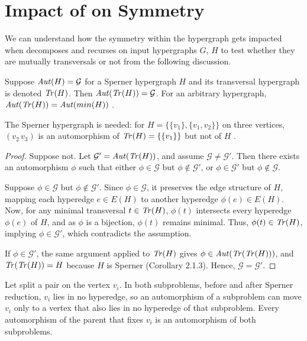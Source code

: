 \section{Impact of \FKA{} on Symmetry}

We can understand how the symmetry within the hypergraph gets impacted when \FKA{} decomposes and recurses on input hypergraphs $G$, $H$ to test whether they are mutually transversals or not from the following discussion.

\begin{lemma}\label{lem:aut-tr}
Suppose $\mathit{Aut}(H)=\mathcal{G}$ for a Sperner hypergraph $H$ and its transversal hypergraph is denoted $\mathit{Tr}(H)$. Then $\mathit{Aut}(\mathit{Tr}(H))=\mathcal{G}$. For an arbitrary hypergraph, $\mathit{Aut}(\mathit{Tr}(H))=\mathit{Aut}(min(H))$ .
\end{lemma}

The Sperner hypergraph is needed: for $H=\{\{v_1\},\{v_1,v_2\}\}$ on three vertices, $(v_2\,v_3)$ is an automorphism of $\mathit{Tr}(H)=\{\{v_1\}\}$ but not of $H$ .

\begin{proof}
Suppose not. Let $\mathcal{G}'=\mathit{Aut}(\mathit{Tr}(H))$, and assume $\mathcal{G}\neq\mathcal{G}'$. Then there exists an automorphism $\phi$ such that either $\phi\in\mathcal{G}$ but $\phi\notin\mathcal{G}'$, or $\phi\in\mathcal{G}'$ but $\phi\notin\mathcal{G}$.

Suppose $\phi\in\mathcal{G}$ but $\phi\notin\mathcal{G}'$. Since $\phi\in\mathcal{G}$, it preserves the edge structure of $H$, mapping each hyperedge $e\in E(H)$ to another hyperedge $\phi(e)\in E(H)$. Now, for any minimal transversal $t\in\mathit{Tr}(H)$, $\phi(t)$ intersects every hyperedge $\phi(e)$ of $H$, and as $\phi$ is a bijection, $\phi(t)$ remains minimal. Thus, $\phi(t)\in\mathit{Tr}(H)$, implying $\phi\in\mathcal{G}'$, which contradicts the assumption.

If $\phi\in\mathcal{G}'$, the same argument applied to $\mathit{Tr}(H)$ gives $\phi\in\mathit{Aut}(\mathit{Tr}(\mathit{Tr}(H)))$, and $\mathit{Tr}(\mathit{Tr}(H))=H$ because $H$ is Sperner (Corollary 2.1.3). Hence, $\mathcal{G}=\mathcal{G}'$.
\end{proof}

\begin{lemma}\label{lem:break}
Let \FKA{} split a pair on the vertex $v_i$. In both subproblems, before and after Sperner reduction, $v_i$ lies in no hyperedge, so an automorphism of a subproblem can move $v_i$ only to a vertex that also lies in no hyperedge of that subproblem. Every automorphism of the parent that fixes $v_i$ is an automorphism of both subproblems.
\end{lemma}

